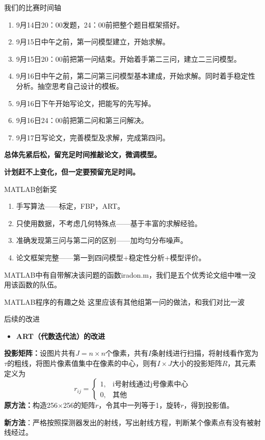 \documentclass[serif]{beamer} %
\begin{document}
  \begin{frame}{我们的比赛时间轴}
	\begin{enumerate}
	  \item \small 9月14日20：00发题，24：00前把整个题目框架搭好。
	  \item \small 9月15日中午之前，第一问模型建立，开始求解。
	  \item \small 9月15日20：00前把第一问结束。开始着手第二三问，建立二三问模型。
	  \item \small 9月16日中午之前，第二问第三问模型基本建成，开始求解。同时着手稳定性分析。抽空思考自己设计的模板。
	  \item \small 9月16日下午开始写论文，把能写的先写掉。
	  \item \small 9月16日24：00前把第二问和第三问解决。
	  \item \small 9月17日写论文，完善模型及求解，完成第四问。
	\end{enumerate}
	\begin{center}
	  \textbf{总体先紧后松，留充足时间推敲论文，微调模型。}
	  
	  \textbf{计划赶不上变化，但一定要预留充足时间。}
	\end{center}
  \end{frame}

  \begin{frame}{MATLAB创新奖}
	\begin{enumerate}
	  \item \small 手写算法——标定，FBP，ART。
	  \item \small 只使用数据，不考虑几何特殊点——基于丰富的求解经验。
	  \item \small 准确发现第三问与第二问的区别——加均匀分布噪声。
	  \item \small 论文框架完整——第一到四问模型+稳定性分析+模型评价。
	\end{enumerate}
	\small MATLAB中有自带解决该问题的函数iradon.m，我们是五个优秀论文组中唯一没用该函数的队伍。
	\end{frame}

	\begin{frame}{MATLAB程序的有趣之处}
		这里应该有其他组第一问的做法，和我们对比一波

	\end{frame}

	\begin{frame}{后续的改进}
		\begin{itemize}
			\item \textbf{ART（代数迭代法）的改进}
		\end{itemize}
		\small \textbf{投影矩阵：}设图片共有\(J = n\times n\)个像素，共有$I$条射线进行扫描，将射线看作宽为\(\tau\)的粗线，将图片像素值集中在像素的中心，则有\(I\times J\)大小的投影矩阵$R$，其元素定义为
		\[r_{ij}=
		\begin{cases}
		1 ,& \text{i号射线通过j号像素中心}\\
		0 ,& \text{其他}
		\end{cases}\]
		\textbf{原方法：}构造256$\times$256的矩阵$r$，令其中一列等于1，旋转$r$，得到投影值。

		\textbf{新方法}：严格按照探测器发出的射线，写出射线方程，判断某个像素点有没有被射线经过。
	\end{frame}
\end{document}
